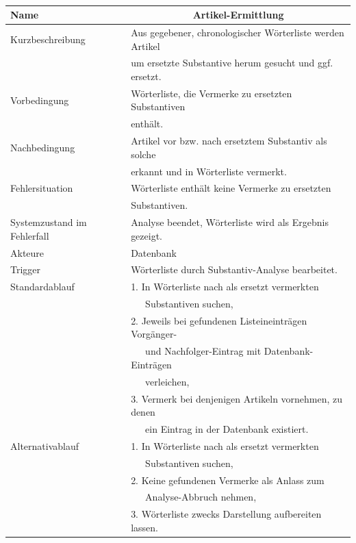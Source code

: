 \documentclass[paper=a4, parskip=half]{scrreprt}
\begin{document}
\newpage
 
\newpage
 
\newpage

\begin{table}[hbt!]
\begin{tabular}{|l|l|}
\hline
Name                        & \multicolumn{1}{c|}{\textbf{Artikel-Ermittlung}} \\ \hline
Kurzbeschreibung            & Aus gegebener, chronologischer Wörterliste werden Artikel \\
                            & um ersetzte Substantive herum gesucht und ggf. ersetzt. \\ \hline
Vorbedingung                & Wörterliste, die Vermerke zu ersetzten Substantiven \\
                            & enthält. \\ \hline
Nachbedingung               & Artikel vor bzw. nach ersetztem Substantiv als solche \\
                            & erkannt und in Wörterliste vermerkt. \\ \hline
Fehlersituation             & Wörterliste enthält keine Vermerke zu ersetzten \\
                            & Substantiven. \\ \hline
Systemzustand im Fehlerfall & Analyse beendet, Wörterliste wird als Ergebnis gezeigt. \\ \hline
Akteure                     & Datenbank \\ \hline
Trigger                     & Wörterliste durch Substantiv-Analyse bearbeitet. \\ \hline
Standardablauf              & 1. In Wörterliste nach als ersetzt vermerkten \\
                            &    Substantiven suchen, \\
                            & 2. Jeweils bei gefundenen Listeineinträgen Vorgänger- \\
                            &    und Nachfolger-Eintrag mit Datenbank-Einträgen \\
                            &    verleichen, \\
                            & 3. Vermerk bei denjenigen Artikeln vornehmen, zu denen \\
                            &    ein Eintrag in der Datenbank existiert. \\ \hline
Alternativablauf            & 1. In Wörterliste nach als ersetzt vermerkten \\
                            &    Substantiven suchen, \\
                            & 2. Keine gefundenen Vermerke als Anlass zum \\
                            &    Analyse-Abbruch nehmen, \\
                            & 3. Wörterliste zwecks Darstellung aufbereiten lassen. \\ \hline
\end{tabular}
\end{table}
\end{document}
